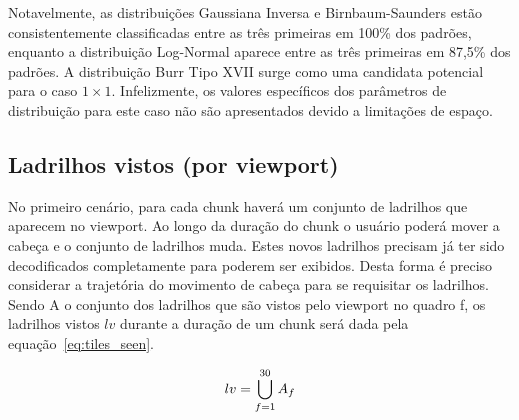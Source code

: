 {Notavelmente, as distribuições Gaussiana Inversa e Birnbaum-Saunders estão consistentemente classificadas entre as três primeiras em 100\% dos padrões, enquanto a distribuição Log-Normal aparece entre as três primeiras em 87,5\% dos padrões. A distribuição Burr Tipo XVII surge como uma candidata potencial para o caso $1 \times 1$. Infelizmente, os valores específicos dos parâmetros de distribuição para este caso não são apresentados devido a limitações de espaço.



\subsection{Ladrilhos vistos (por viewport)}

No primeiro cenário, para cada chunk haverá um conjunto de ladrilhos que aparecem no viewport. Ao longo da duração do chunk o usuário poderá mover a cabeça e o conjunto de ladrilhos muda. Estes novos ladrilhos precisam já ter sido decodificados completamente para poderem ser exibidos. Desta forma é preciso considerar a trajetória do movimento de cabeça para se requisitar os ladrilhos. Sendo A o conjunto dos ladrilhos que são vistos pelo viewport no quadro f, os ladrilhos vistos $lv$ durante a duração de um chunk será dada pela equação~\ref{eq:tiles_seen}.

\begin{equation}
        lv=\bigcup^{30}_{f=1} A_f \\    
        \label{eq:tiles_seen}
\end{equation}

}
